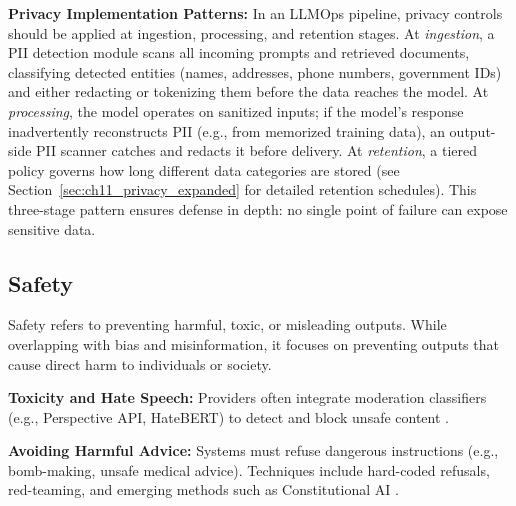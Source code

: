 \textbf{Privacy Implementation Patterns:} In an LLMOps pipeline, privacy controls should be applied at ingestion, processing, and retention stages. At \emph{ingestion}, a PII detection module scans all incoming prompts and retrieved documents, classifying detected entities (names, addresses, phone numbers, government IDs) and either redacting or tokenizing them before the data reaches the model. At \emph{processing}, the model operates on sanitized inputs; if the model's response inadvertently reconstructs PII (e.g., from memorized training data), an output-side PII scanner catches and redacts it before delivery. At \emph{retention}, a tiered policy governs how long different data categories are stored (see Section~\ref{sec:ch11_privacy_expanded} for detailed retention schedules). This three-stage pattern ensures defense in depth: no single point of failure can expose sensitive data.


\subsection{Safety}

Safety refers to preventing harmful, toxic, or misleading outputs. While overlapping with bias and misinformation, it focuses on preventing outputs that cause direct harm to individuals or society.

\textbf{Toxicity and Hate Speech:} Providers often integrate moderation classifiers (e.g., Perspective API, HateBERT) to detect and block unsafe content \cite{arxiv2023}.

\textbf{Avoiding Harmful Advice:} Systems must refuse dangerous instructions (e.g., bomb-making, unsafe medical advice). Techniques include hard-coded refusals, red-teaming, and emerging methods such as Constitutional AI \cite{openai2023}.

